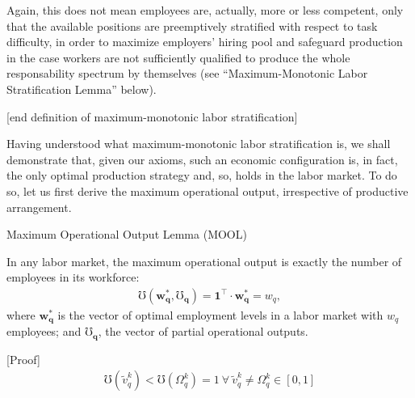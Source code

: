 \documentclass[hidelinks, nonatbib]{elsarticle}
\begin{document}
\begin{enumerate}
Again, this does not mean employees are, actually, more or less competent, only that the available positions are preemptively stratified with respect to task difficulty, in order to maximize employers' hiring pool and safeguard production in the case workers are not sufficiently qualified to produce the whole responsability spectrum by themselves (see ``Maximum-Monotonic Labor Stratification Lemma'' below).

[end definition of maximum-monotonic labor stratification]

Having understood what maximum-monotonic labor stratification is, we shall demonstrate that, given our axioms, such an economic configuration is, in fact, the only optimal production strategy and, so, holds in the labor market. To do so, let us first derive the maximum operational output, irrespective of productive arrangement.

Maximum Operational Output Lemma (MOOL)

    In any labor market, the maximum operational output is exactly the number of employees in its workforce:
    \begin{gather}
        \mho(
            \boldsymbol{w_{q}^{*}},
            \boldsymbol{\mho_q}
        ) = 
        \boldsymbol{1} ^ {\top}
        \cdot
        \boldsymbol{w_{q}^{*}}
        = w_q
        ,
    \end{gather}
    where $\boldsymbol{w_{q}^{*}}$ is the vector of optimal employment levels in a labor market with $w_q$ employees; and $\boldsymbol{\mho_q}$, the vector of partial operational outputs. 
    
    [Proof]
    \begin{align}
        \mho(\tilde{v}_{q}^{k}) < 
        \mho(\Omega_{q}^{k}) 
        = 1
        \
        \forall
        \
        \tilde{v}_{q}^{k}
        \neq
        \Omega_{q}^{k}
        \in [0,1]
    \end{align}
    

\end{enumerate}
\end{document}

